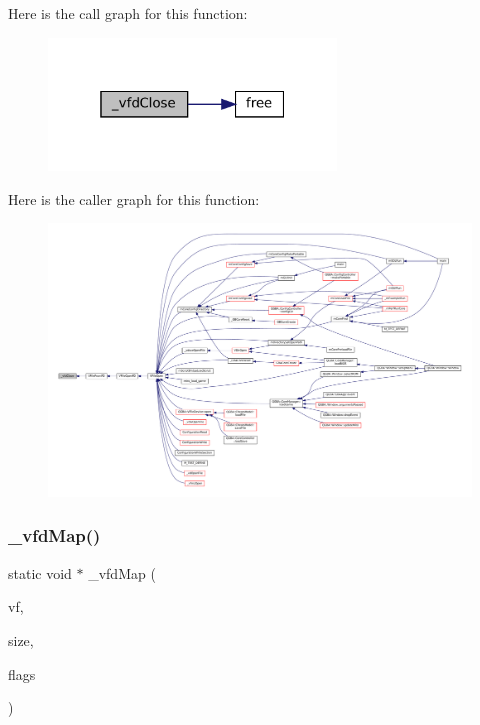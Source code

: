 Here is the call graph for this function\+:
\nopagebreak
\begin{figure}[H]
\begin{center}
\leavevmode
\includegraphics[width=217pt]{vfs-fd_8c_afe7a343ac521b428d98e41710a96e584_cgraph}
\end{center}
\end{figure}
Here is the caller graph for this function\+:
\nopagebreak
\begin{figure}[H]
\begin{center}
\leavevmode
\includegraphics[width=350pt]{vfs-fd_8c_afe7a343ac521b428d98e41710a96e584_icgraph}
\end{center}
\end{figure}
\mbox{\label{vfs-fd_8c_a12d1697e3d7ebc27c66cb2bfb5d8b025}} 
\subsubsection{\texorpdfstring{\+\_\+vfd\+Map()}{\_vfdMap()}}
{\footnotesize\ttfamily static void $\ast$ \+\_\+vfd\+Map (\begin{DoxyParamCaption}\item[{struct V\+File $\ast$}]{vf,  }\item[{size\+\_\+t}]{size,  }\item[{\mbox{\hyperlink{ioapi_8h_a787fa3cf048117ba7123753c1e74fcd6}{int}}}]{flags }\end{DoxyParamCaption})\hspace{0.3cm}{\ttfamily [static]}}

